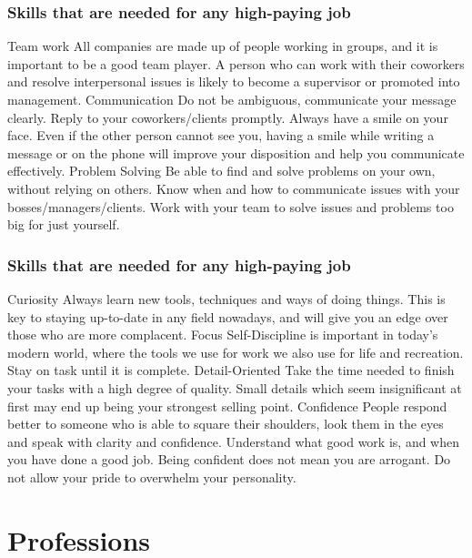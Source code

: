 \documentclass{beamer}
\begin{document}
\begin{frame}
	\frametitle{Skills that are needed for any high-paying job}
	\begin{outline}
		\1 Team work
		\2 All companies are made up of people working in groups, and it is important to be a good team player.
		\2 A person who can work with their coworkers and resolve interpersonal issues is likely to become a supervisor or promoted into management.
		\1 Communication
		\2 Do not be ambiguous, communicate your message clearly.
		\2 Reply to your coworkers/clients promptly.
		\2 Always have a smile on your face.
		\3 Even if the other person cannot see you, having a smile while writing a message or on the phone will improve your disposition and help you communicate effectively.
		\1 Problem Solving
		\2 Be able to find and solve problems on your own, without relying on others.
		\2 Know when and how to communicate issues with your bosses/managers/clients. 
		\2 Work with your team to solve issues and problems too big for just yourself.
	\end{outline}
\end{frame}

\begin{frame}
	\frametitle{Skills that are needed for any high-paying job}
	\begin{outline}
		\1 Curiosity
		\2 Always learn new tools, techniques and ways of doing things.
		\2 This is key to staying up-to-date in any field nowadays, and will give you an edge over those who are more complacent.
		\1 Focus
		\2 Self-Discipline is important in today's modern world, where the tools we use for work we also use for life and recreation.
		\2 Stay on task until it is complete.  
		\1 Detail-Oriented
		\2 Take the time needed to finish your tasks with a high degree of quality.
		\2 Small details which seem insignificant at first may end up being your strongest selling point.
		\1 Confidence
		\2 People respond better to someone who is able to square their shoulders, look them in the eyes and speak with clarity and confidence.
		\2 Understand what good work is, and when you have done a good job.
		\2 Being confident does not mean you are arrogant.  Do not allow your pride to overwhelm your personality.
	\end{outline}
\end{frame}


\section{Professions}
\end{document}
